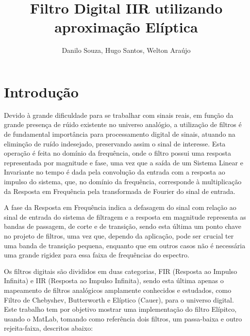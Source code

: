 \documentclass[a4paper,10pt]{article}
\title{Filtro Digital IIR utilizando aproximação Elíptica}
\author{Danilo Souza, Hugo Santos, Welton Araújo}
\begin{document}
\maketitle

\section{Introdução}



Devido à grande dificuldade para se trabalhar com sinais reais, em função da grande  presença de rúido existente no universo analógio, a utilização de filtros é de fundamental importância para processamento digital de sinais, atuando na eliminção de ruído indesejado, preservando assim o sinal de interesse. Esta operação é feita no domínio da frequência, onde o filtro possui uma resposta representada por magnitude e fase, uma vez que a saída de um Sistema Linear e Invariante no tempo é dada pela convolução da entrada com a resposta ao impulso do sistema, que, no domínio da frequência, corresponde à multiplicação da Resposta em Frequência pela transformada de Fourier do sinal de entrada.

A fase da Resposta em Frequência indica a defasagem do sinal com relação ao sinal de entrada do sistema de filtragem e a resposta em magnitude representa as bandas de passagem, de corte e de transição, sendo esta última um ponto chave no projeto de filtros, uma vez que, dependo da aplicação, pode ser crucial ter uma banda de transição pequena, enquanto que em outros casos não é necessária uma grande rigidez para essa faixa de frequências do espectro.
 
Os filtros digitais são divididos em duas categorias, FIR (Resposta ao Impulso Infinita) e IIR (Resposta ao Impulso Infinita), sendo esta última apenas o mapeamento de filtros analógicos amplamente conhecidos e estudados, como Filtro de Chebyshev, Butterworth e Elíptico (Cauer), para o universo digital. 
Este trabalho tem por objetivo mostrar uma implementação do filtro Elípitco, usando o MatLab, tomando como referência dois filtros, um passa-baixa e outro rejeita-faixa, descritos abaixo:   
\end{document}

